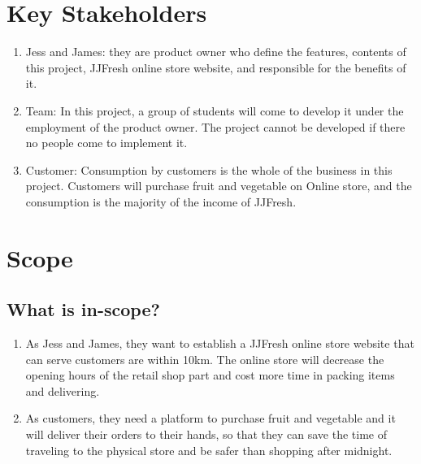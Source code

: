 \documentclass{report}
\begin{document}
\section{Key Stakeholders}
\begin{enumerate}
  \item Jess and James: they are product owner who define the features, contents of this project, JJFresh online store website, and responsible for the benefits of it.
  \item Team: In this project, a group of students will come to develop it under the employment of the product owner. The project cannot be developed if there no people come to implement it.
  \item Customer: Consumption by customers is the whole of the business in this project. Customers will purchase fruit and vegetable on Online store, and the consumption is the majority of the income of JJFresh.
\end{enumerate}

\section{Scope}
\subsection{What is in-scope?}
\begin{enumerate}
  \item As Jess and James, they want to establish a JJFresh online store website that can serve customers are within 10km. The online store will decrease the opening hours of the retail shop part and cost more time in packing items and delivering.
  \item As customers, they need a platform to purchase fruit and vegetable and it will deliver their orders to their hands, so that they can save the time of traveling to the physical store and be safer than shopping after midnight.
\end{enumerate}
\end{document}
